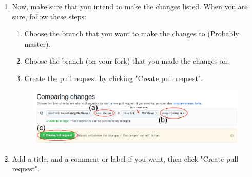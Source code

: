 \begin{enumerate}
\begin{figure}[H]
        \label{fig:fork}
    \end{figure}
    \item Now, make sure that you intend to make the changes listed. When you are sure, follow these steps:
    \begin{enumerate}
        \item Choose the branch that you want to make the changes to (Probably master).
        \item Choose the branch (on your fork) that you made the changes on. 
        \item Create the pull request by clicking "Create pull request".
    \end{enumerate}
    \begin{figure}[H]
        \centering
        \includegraphics[scale=0.4]{img/ComparingChanges.png}
        \label{fig:comparechanges}
    \end{figure}
    \item Add a title, and a comment or label if you want, then click "Create pull request".
\end{enumerate}

